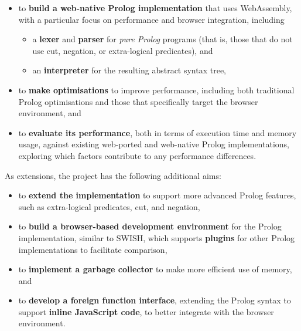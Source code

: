 \begin{itemize}
\item to \textbf{build a web-native Prolog implementation} that uses WebAssembly, with a particular focus on performance and browser integration, including
\begin{itemize}
\item a \textbf{lexer} and \textbf{parser} for \emph{pure Prolog} programs (that is, those that do not use cut, negation, or extra-logical predicates), and
\item an \textbf{interpreter} for the resulting abstract syntax tree,
\end{itemize}
\item to \textbf{make optimisations} to improve performance, including both traditional Prolog optimisations and those that specifically target the browser environment, and
\item to \textbf{evaluate its performance}, both in terms of execution time and memory usage, against existing web-ported and web-native Prolog implementations, exploring which factors contribute to any performance differences.
\end{itemize}

As extensions, the project has the following additional aims:

\begin{itemize}
\item to \textbf{extend the implementation} to support more advanced Prolog features, such as extra-logical predicates, cut, and negation,
\item to \textbf{build a browser-based development environment} for the Prolog implementation, similar to SWISH, which supports \textbf{plugins} for other Prolog implementations to facilitate comparison,
\item to \textbf{implement a garbage collector} to make more efficient use of memory, and
\item to \textbf{develop a foreign function interface}, extending the Prolog syntax to support \textbf{inline JavaScript code}, to better integrate with the browser environment.
\end{itemize}